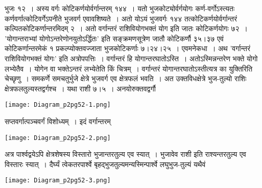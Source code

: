 \documentclass[11pt, openany]{book}
\begin{document}
\newpage

\begin{sloppypar}
\noindent भुजः १२~। अस्य वर्गः कोटिकर्णयोर्वर्गान्तरम् १४४~। यतो भुजकोट्योर्वर्गयोगः कर्ण-वर्गोऽस्त्यतः कर्णवर्गात्कोटिवर्गेऽपनीते भुजवर्ग एवावशिष्यते~। अतो योऽयं भुजवर्गः १४४ तत्कोटिकर्णयोर्वर्गान्तरं कल्पितकोटिकर्णान्तरमिदम् २~। अतो वर्गान्तरं राशिवियोगभक्तं योग इति जातः कोटिकर्णयोगः ७२~। {\color{violet}'योगान्तराभ्यां योगोऽन्तरेणोनयुतोऽर्द्धितः'} इति सङ्क्रमणसूत्रेण जातौ कोटिकर्णौ ३५।३७ एवं कोटिकर्णान्तरमेकं १ प्रकल्प्योक्तवज्जाता भुजकोटिकर्णाः ७।२४।२५~। एवमनेकधा~। अथ {\color{violet}'वर्गान्तरं राशिवियोगभक्तं योगः'} इति अत्रोपपत्तिः~। वर्गान्तरं हि योगान्तरघातोऽस्ति~। अतोऽस्मिन्नन्तरेण भक्ते योगो लभ्येतैव~। योगेन वा भक्तेऽन्तरं लभ्येतेति किं चित्रम्~। वर्गान्तरं योगान्तरघातोऽस्तीत्यत्र का युक्तिरिति चेच्छृणु~। समकर्णे समचतुर्भुजे क्षेत्रे भुजवर्ग एव क्षेत्रफलं भवति~। अत उक्तविधक्षेत्रे भुज-तुल्यो राशिः क्षेत्रफलतुल्यस्तद्वर्गश्च~। यथा राशी ७।५~। अनयोरुक्तवद्वर्गौ

\begin{center}
    \texttt{[image: Diagram\_p2pg52-1.png]}
\end{center}

\noindent सप्तवर्गात्पञ्चवर्गं विशोध्यम्~। इदं वर्गान्तरम्

\begin{center}
    \texttt{[image: Diagram\_p2pg52-2.png]}
\end{center}

\noindent अत्र पार्श्वद्वयेऽपि क्षेत्रशेषस्य विस्तारो भुजान्तरतुल्य एव स्यात्~। भुजावेव राशी इति राश्यन्तरतुल्य एव विस्तारः स्यात्~। दैर्घ्यं त्वेकतरपार्श्वे बृहद्भुजतुल्यमन्यस्मिन्पार्श्वे लघुभुज-तुल्यं यथैवं
\begin{center}
    \texttt{[image: Diagram\_p2pg52-3.png]}
\end{center}
\end{sloppypar}

\newpage
\end{document}

